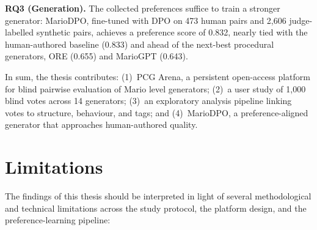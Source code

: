 \documentclass[shortabstract, mgr, english]{iithesis}
\begin{document}
\textbf{RQ3 (Generation).} The collected preferences suffice to train
a stronger generator: MarioDPO, fine-tuned with DPO on 473 human pairs and 2,606
judge-labelled synthetic pairs, achieves a preference score of 0.832,
nearly tied with the human-authored baseline (0.833) and ahead of
the next-best procedural generators, ORE (0.655) and MarioGPT (0.643).


In sum, the thesis contributes: (1)~PCG Arena, a persistent
open-access platform for blind pairwise evaluation of Mario level generators;
(2)~a user study of 1,000 blind votes across 14 generators; (3)~an exploratory
analysis pipeline linking votes to structure, behaviour, and tags; and
(4)~MarioDPO, a preference-aligned generator that approaches human-authored
quality.

\section{Limitations}
\label{sec:conc-limitations}

The findings of this thesis should be interpreted in light of several
methodological and technical limitations across the study protocol, the
platform design, and the preference-learning pipeline:
\end{document}
